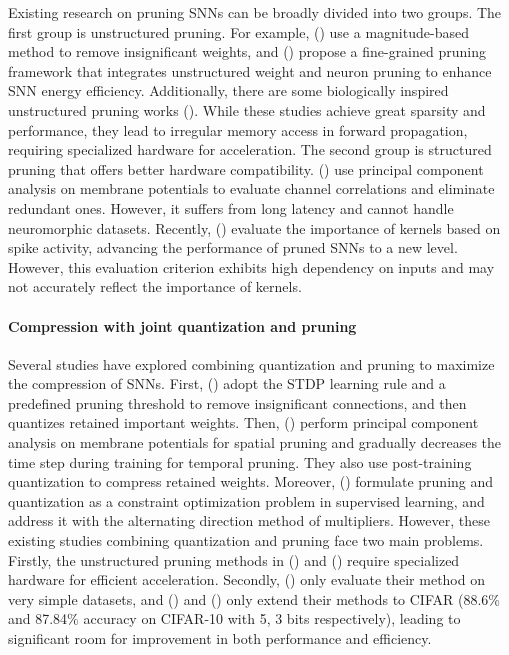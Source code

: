 Existing research on pruning SNNs can be broadly divided into two groups.
The first group is unstructured pruning.
For example, (\cite{yin2021energy}) use a magnitude-based method to remove insignificant weights, and (\cite{shi2023towards}) propose a fine-grained pruning framework that integrates unstructured weight and neuron pruning to enhance SNN energy efficiency.
Additionally, there are some biologically inspired unstructured pruning works (\cite{bellec2017deep,chen2022state}).
While these studies achieve great sparsity and performance, they lead to irregular memory access in forward propagation, requiring specialized hardware for acceleration.
The second group is structured pruning that offers better hardware compatibility.
(\cite{chowdhury2021spatio}) use principal component analysis on membrane potentials to evaluate channel correlations and eliminate redundant ones.
However, it suffers from long latency and cannot handle neuromorphic datasets.
Recently, (\cite{li2024towards}) evaluate the importance of kernels based on spike activity, advancing the performance of pruned SNNs to a new level.
However, this evaluation criterion exhibits high dependency on inputs and may not accurately reflect the importance of kernels.


\paragraph{Compression with joint quantization and pruning}
Several studies have explored combining quantization and pruning to maximize the compression of SNNs.
First, (\cite{rathi2018stdp}) adopt the STDP learning rule and a predefined pruning threshold to remove insignificant connections, and then quantizes retained important weights.
Then, (\cite{chowdhury2021spatio}) perform principal component analysis on membrane potentials for spatial pruning and gradually decreases the time step during training for temporal pruning. They also use post-training quantization to compress retained weights.
Moreover, (\cite{deng2021comprehensive}) formulate pruning and quantization as a constraint optimization problem in supervised learning, and address it with the alternating direction method of multipliers.
However, these existing studies combining quantization and pruning face two main problems.
Firstly, the unstructured pruning methods in (\cite{rathi2018stdp}) and (\cite{deng2021comprehensive}) require specialized hardware for efficient acceleration.
Secondly, (\cite{rathi2018stdp}) only evaluate their method on very simple datasets, and (\cite{chowdhury2021spatio}) and (\cite{deng2021comprehensive}) only extend their methods to CIFAR (88.6\% and 87.84\% accuracy on CIFAR-10 with 5, 3 bits respectively), leading to significant room for improvement in both performance and efficiency.
